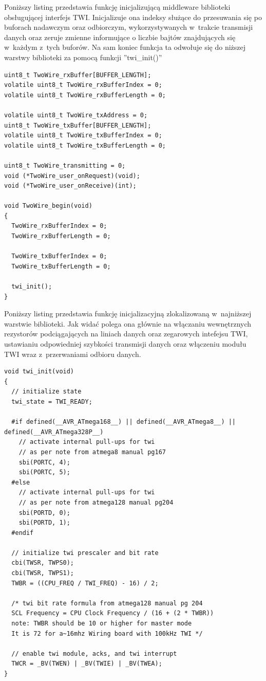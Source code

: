 Poniższy listing przedstawia funkcję inicjalizującą middleware biblioteki obsługującej interfejs TWI. Inicjalizuje ona indeksy służące do przesuwania się po buforach nadawczym oraz odbiorczym, wykorzystywanych w~trakcie transmisji danych oraz zeruje zmienne informujące o liczbie bajtów znajdujących się w~każdym z~tych buforów. Na sam koniec funkcja ta odwołuje się do niższej warstwy biblioteki za pomocą funkcji ''twi\_init()''


\begin{lstlisting}
uint8_t TwoWire_rxBuffer[BUFFER_LENGTH];
volatile uint8_t TwoWire_rxBufferIndex = 0;
volatile uint8_t TwoWire_rxBufferLength = 0;

volatile uint8_t TwoWire_txAddress = 0;
uint8_t TwoWire_txBuffer[BUFFER_LENGTH];
volatile uint8_t TwoWire_txBufferIndex = 0;
volatile uint8_t TwoWire_txBufferLength = 0;

uint8_t TwoWire_transmitting = 0;
void (*TwoWire_user_onRequest)(void);
void (*TwoWire_user_onReceive)(int);

void TwoWire_begin(void)
{
  TwoWire_rxBufferIndex = 0;
  TwoWire_rxBufferLength = 0;

  TwoWire_txBufferIndex = 0;
  TwoWire_txBufferLength = 0;

  twi_init();
}
\end{lstlisting}

Poniższy listing przedstawia funkcję inicjalizacyjną zlokalizowaną w~najniższej warstwie biblioteki. Jak widać polega ona głównie na włączaniu wewnętrznych rezystorów podciągających na liniach danych oraz zegarowych intefejsu TWI, ustawianiu odpowiedniej szybkości transmisji danych oraz włączeniu modułu TWI wraz z~przerwaniami odbioru danych.

\begin{lstlisting}
void twi_init(void)
{
  // initialize state
  twi_state = TWI_READY;

  #if defined(__AVR_ATmega168__) || defined(__AVR_ATmega8__) || defined(__AVR_ATmega328P__)
    // activate internal pull-ups for twi
    // as per note from atmega8 manual pg167
    sbi(PORTC, 4);
    sbi(PORTC, 5);
  #else
    // activate internal pull-ups for twi
    // as per note from atmega128 manual pg204
    sbi(PORTD, 0);
    sbi(PORTD, 1);
  #endif

  // initialize twi prescaler and bit rate
  cbi(TWSR, TWPS0);
  cbi(TWSR, TWPS1);
  TWBR = ((CPU_FREQ / TWI_FREQ) - 16) / 2;

  /* twi bit rate formula from atmega128 manual pg 204
  SCL Frequency = CPU Clock Frequency / (16 + (2 * TWBR))
  note: TWBR should be 10 or higher for master mode
  It is 72 for a~16mhz Wiring board with 100kHz TWI */

  // enable twi module, acks, and twi interrupt
  TWCR = _BV(TWEN) | _BV(TWIE) | _BV(TWEA);
}
\end{lstlisting}

